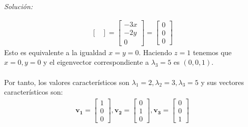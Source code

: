 \documentclass[12pt]{article}
\newenvironment{sol}
    {\emph{Solución:}
    }
    {
    }
\begin{document}
\begin{sol}
\begin{align*}
\begin{bmatrix}
\end{bmatrix} =
\begin{bmatrix}
-3x\\-2y\\0
\end{bmatrix}=
\begin{bmatrix}
0\\0\\0
\end{bmatrix}
\end{align*}
Esto es equivalente a la igualdad $x=y=0$. Haciendo $z=1$ tenemos que $x=0,y=0$ y el eigenvector correspondiente a $\lambda_3=5$ es $(0,0,1)$.\\\\
Por tanto, los valores característicos son $\lambda_1=2,\lambda_2=3,\lambda_3=5$ y sus vectores característicos son:
\begin{align*}\mathbf{v_1}=
\begin{bmatrix}
1\\0\\0
\end{bmatrix},\mathbf{v_2}=
\begin{bmatrix}
0\\1\\0
\end{bmatrix},\mathbf{v_3}=
\begin{bmatrix}
0\\0\\1
\end{bmatrix}
\end{align*} \\ \\
\end{sol}

\end{document}
